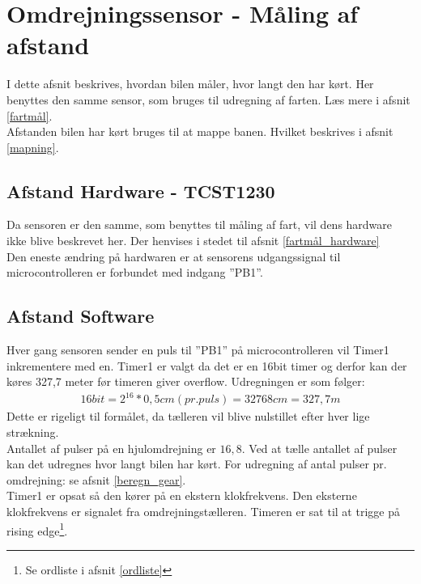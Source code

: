 \section{Omdrejningssensor - Måling af afstand}
\label{afstandmaal}
I dette afsnit beskrives, hvordan bilen måler, hvor langt den har kørt. Her benyttes den samme sensor, som bruges til udregning af farten. Læs mere i afsnit \ref{fartmål}. \\
Afstanden bilen har kørt bruges til at mappe banen. Hvilket beskrives i afsnit \ref{mapning}.

\subsection{Afstand Hardware - TCST1230}
\label{afstandmaal_hardware}
Da sensoren er den samme, som benyttes til måling af fart, vil dens hardware ikke blive beskrevet her. Der henvises i stedet til afsnit \ref{fartmål_hardware} \\
Den eneste ændring på hardwaren er at sensorens udgangssignal til microcontrolleren er forbundet med indgang ”PB1”.

\newpage
\subsection{Afstand Software}
\label{afstandmaal_software}
Hver gang sensoren sender en puls til ”PB1” på microcontrolleren vil Timer1 inkrementere med en. Timer1 er valgt da det er en 16bit timer og derfor kan der køres 327,7 meter før timeren giver overflow. Udregningen er som følger: 
\begin{align*}
16bit = 2^{16} * 0,5cm (pr. puls) = 32768 cm = 327,7 m
\end{align*}
Dette er rigeligt til formålet, da tælleren vil blive nulstillet efter hver lige strækning. \\

Antallet af pulser på en hjulomdrejning er \(16,8\). Ved at tælle antallet af pulser kan det udregnes hvor langt bilen har kørt.  For udregning af antal pulser pr. omdrejning: se afsnit \ref{beregn_gear}. \\

Timer1 er opsat så den kører på en ekstern klokfrekvens. Den eksterne klokfrekvens er signalet fra omdrejningstælleren. Timeren er sat til at trigge på rising edge\footnote{Se ordliste i afsnit \ref{ordliste}}. 

